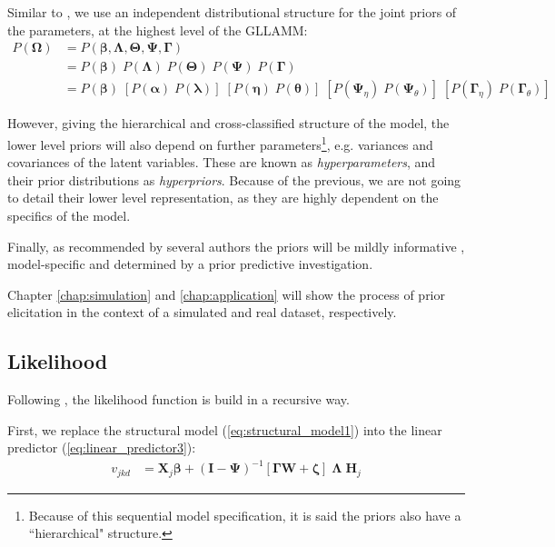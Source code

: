 Similar to \citet{Patz_et_al_1999}, we use an independent distributional structure for the joint priors of the parameters, at the highest level of the GLLAMM:
%
\begin{equation} \label{eq:priors}
	\begin{split}
		P( \pmb{\Omega} ) & = P( \pmb{\beta}, \pmb{\Lambda}, \pmb{\Theta}, \pmb{\Psi}, \pmb{\Gamma} ) \\
		&= P( \pmb{\beta} ) \; P( \pmb{\Lambda} ) \; P( \pmb{\Theta} ) \; P( \pmb{\Psi} ) \; P( \pmb{\Gamma} ) \\
		&= P( \pmb{\beta} ) \; \left[ P( \pmb{\alpha} ) \; P( \pmb{\lambda} ) \right] \; \left[ P( \pmb{\eta} ) \; P( \pmb{\theta} ) \right] \; \left[ P( \pmb{\Psi}_{\eta} ) \; P( \pmb{\Psi}_{\theta} ) \right] \; \left[ P( \pmb{\Gamma}_{\eta} ) \; P( \pmb{\Gamma}_{\theta} ) \right]
	\end{split}
\end{equation}

\noindent However, giving the hierarchical and cross-classified structure of the model, the lower level priors will also depend on further parameters\footnote{Because of this sequential model specification, it is said the priors also have a ``hierarchical" structure.}, e.g. variances and covariances of the latent variables. These are known as \textit{hyperparameters}, and their prior distributions as \textit{hyperpriors}. Because of the previous, we are not going to detail their lower level representation, as they are highly dependent on the specifics of the model.

Finally, as recommended by several authors the priors will be mildly informative \cite{McElreath_2020, Fujimoto_2020, Tarazona_2013, Jiao_et_al_2012, Azevedo_2003, Wollack_2002}, model-specific and determined by a prior predictive investigation. 

Chapter \ref{chap:simulation} and \ref{chap:application} will show the process of prior elicitation in the context of a simulated and real dataset, respectively.


\subsection{Likelihood}

Following \citet{Rabe_et_al_2004a}, the likelihood function is build in a recursive way. 

\noindent First, we replace the structural model (\ref{eq:structural_model1}) into the linear predictor (\ref{eq:linear_predictor3}):
%
\begin{equation} \label{eq:lin_pred}
	\begin{split}
		v_{jkd} &= \mathbf{X}_{j} \pmb{\beta} + ( \mathbf{I} - \pmb{\Psi} )^{-1} \left[ \pmb{\Gamma} \mathbf{W} + \pmb{\zeta} \right] \; \pmb{\Lambda} \; \mathbf{H}_{j}
	\end{split}
\end{equation}

